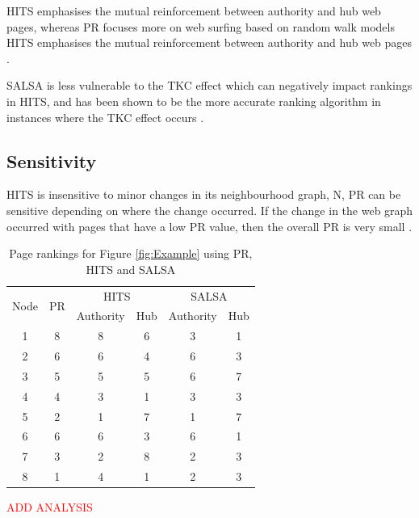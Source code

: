 \documentclass[11pt]{report}
\begin{document}
{HITS emphasises the mutual reinforcement between authority and hub web pages, whereas PR focuses more on web surfing based on random walk models HITS emphasises the mutual reinforcement between authority and hub web pages \cite{ding2003pagerank}.

SALSA is less vulnerable to the TKC effect which can negatively impact rankings in HITS, and has been shown to be the more accurate ranking algorithm in instances where the TKC effect occurs \cite{lempel2000stochastic}.

\subsection{Sensitivity}

HITS is insensitive to minor changes in its neighbourhood graph, N, PR can be sensitive depending on where the change occurred. If the change in the web graph occurred with pages that have a low PR value, then the overall PR is very small \cite{ng2001stable}.

\begin{table}[H] \caption{Page rankings for Figure \ref{fig:Example} using PR, HITS and SALSA }
 \centering
 \begin{tabular} {c| c| c| c| c| c} 
 \multirow{2}{*}{Node} & \multirow{2}{*}{PR} & \multicolumn{2}{|c|}{HITS} & \multicolumn{2}{|c}{SALSA} \\ [0.5ex] 
 {}&{}&Authority & Hub & Authority & Hub\\ 
 \hline
 1&8&8&6&3&1\\
 2&6&6&4&6&3\\
 3&5&5&5&6&7\\
 4&4&3&1&3&3\\
 5&2&1&7&1&7\\
 6&6&6&3&6&1\\
 7&3&2&8&2&3\\
 8&1&4&1&2&3\\
 \end{tabular}
 \label{Table: comparison}
\end{table}

 \textcolor{red}{ADD ANALYSIS}
 
}
\end{document}
